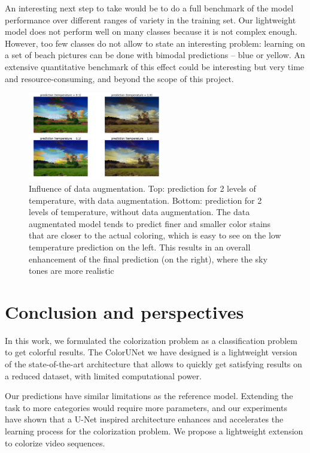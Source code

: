 \documentclass[10pt,twocolumn,letterpaper]{article}
\begin{document}
An interesting next step to take would be to do a full benchmark of the model performance over different ranges of variety in the training set. Our lightweight model does not perform well on many classes because it is not complex enough. However, too few classes do not allow to state an interesting problem: \eg learning on a set of beach pictures can be done with bimodal predictions -- blue or yellow. An extensive quantitative benchmark of this effect could be interesting but very time and resource-consuming, and beyond the scope of this project.
\begin{figure}
\begin{center}
\includegraphics[width=220px]{da_comp}
\caption{Influence of data augmentation. Top: prediction for 2 levels of temperature, with data augmentation. Bottom:  prediction for 2 levels of temperature, without data augmentation. The data augmentated model tends to predict finer and smaller color stains that are closer to the actual coloring, which is easy to see on the low temperature prediction on the left. This results in an overall enhancement of the final prediction (on the right), where the sky tones are more realistic}
\label{dacomp}
\end{center}
\end{figure}
\section{Conclusion and perspectives}

In this work, we formulated the colorization problem as a classification problem to get colorful results. The ColorUNet we have designed is a lightweight version of the state-of-the-art architecture that allows to quickly get satisfying results on a reduced dataset, with limited computational power.

Our predictions have similar limitations as the reference model. Extending the task to more categories would require more parameters, and our experiments have shown that a U-Net inspired architecture enhances and accelerates the learning process for the colorization problem. We propose a lightweight extension to colorize video sequences.
\end{document}
